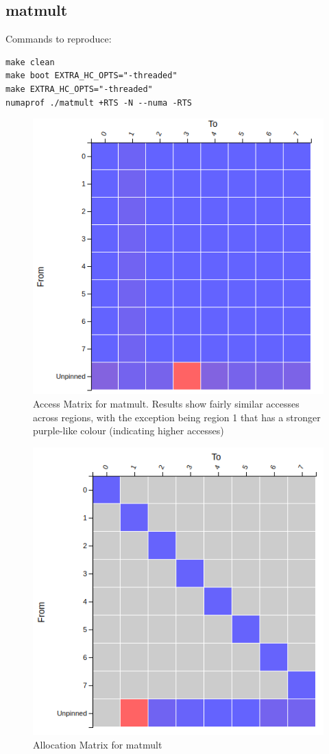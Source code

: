 \documentclass[a4paper,11pt]{article}
\begin{document}
\subsection{matmult}

Commands to reproduce:
\begin{lstlisting}
make clean
make boot EXTRA_HC_OPTS="-threaded"
make EXTRA_HC_OPTS="-threaded"
numaprof ./matmult +RTS -N --numa -RTS
\end{lstlisting}

\begin{figure}[!htb]
    \centering
    \includegraphics[width=0.5\linewidth]{TechMemo/results/matmult/matmult_accessMatrix.png}
    \caption{Access Matrix for matmult. Results show fairly similar accesses across regions, with the exception being region 1 that has a stronger purple-like colour (indicating higher accesses)}
    \label{fig:matmult_access_matrix}
\end{figure}

\begin{figure}[!htb]
    \centering
    \includegraphics[width=0.5\linewidth]{TechMemo/results/matmult/matrix_mult_allocMatrix.png}
    \caption{Allocation Matrix for matmult}
    \label{fig:matmult_alloc_matrix}
\end{figure}
\end{document}
